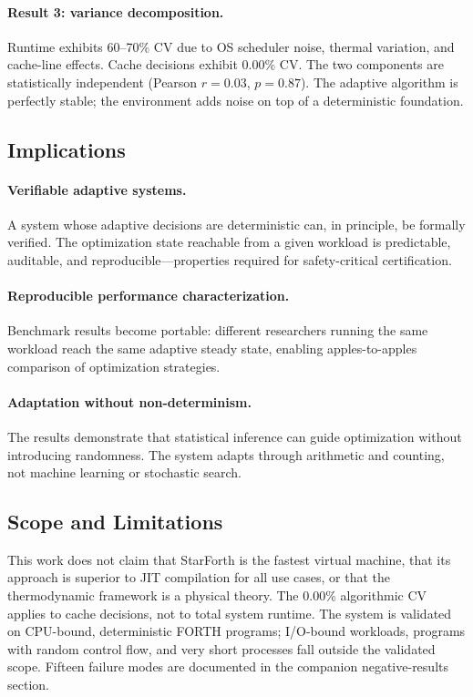 \paragraph{Result 3: variance decomposition.}
Runtime exhibits 60--70\% CV due to OS scheduler noise, thermal variation,
and cache-line effects. Cache decisions exhibit 0.00\% CV. The two components
are statistically independent (Pearson $r = 0.03$, $p = 0.87$). The
adaptive algorithm is perfectly stable; the environment adds noise on top
of a deterministic foundation.

\subsection{Implications}

\paragraph{Verifiable adaptive systems.}
A system whose adaptive decisions are deterministic can, in principle, be
formally verified. The optimization state reachable from a given workload is
predictable, auditable, and reproducible---properties required for
safety-critical certification.

\paragraph{Reproducible performance characterization.}
Benchmark results become portable: different researchers running the same
workload reach the same adaptive steady state, enabling apples-to-apples
comparison of optimization strategies.

\paragraph{Adaptation without non-determinism.}
The results demonstrate that statistical inference can guide optimization
without introducing randomness. The system adapts through arithmetic and
counting, not machine learning or stochastic search.

\subsection{Scope and Limitations}

This work does not claim that StarForth is the fastest virtual machine, that
its approach is superior to JIT compilation for all use cases, or that the
thermodynamic framework is a physical theory. The 0.00\% algorithmic CV
applies to cache decisions, not to total system runtime. The system is
validated on CPU-bound, deterministic FORTH programs; I/O-bound workloads,
programs with random control flow, and very short processes fall outside the
validated scope. Fifteen failure modes are documented in the companion
negative-results section.


